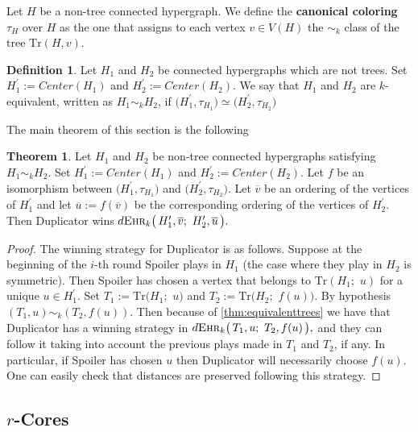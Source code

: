 \documentclass[12pt,notitlepage,a4paper]{article}
\theoremstyle{definition}
\newtheorem{theorem}{Theorem}[section]
\newtheorem{definition}{Definition}[section]
\newcommand{\ehr}{\textsc{Ehr}}
\newcommand{\Tr}{\mathrm{Tr}}
\begin{document}
Let $H$ be a non-tree connected hypergraph. We define
the \textbf{canonical coloring} $\tau_{H}$ over $H$
as the one that assigns to each vertex $v\in V(H)$ the $\sim_k$ class of the tree
$\Tr(H,v)$.\par

\begin{definition}
	Let $H_1$ and $H_2$ be connected hypergraphs which are not trees.
	Set $H^\prime_1:= Center(H_1)$ and $H^\prime_2:= Center(H_2)$.
	We say that $H_1$ and $H_2$ are $k$-equivalent,
	written as $H_1\sim_k H_2$, if
	$\big( H^\prime_1,\tau_{H_1}\big) \simeq 
	\big(H^\prime_2,\tau_{H_2}\big)$
\end{definition}

The main theorem of this section is the following
	
	\begin{theorem} \label{thm:strategyaux}
		Let $H_1$ and $H_2$ be non-tree 
		connected hypergraphs satisfying
		$H_1\sim_k H_2$. 
		Set $H^\prime_1:= Center(H_1)$ and 
		$H^\prime_2:= Center(H_2)$. Let $f$ be an isomorphism
		between $\big( H^\prime_1,\tau_{H_1}\big)$ and 
		$\big(H^\prime_2,\tau_{H_2}\big)$. Let $\overline{v}$ 
		be an ordering of the vertices of $H^\prime_1$ and let
		$\overline{u}:=f(\overline{v})$ be the corresponding
		ordering of the vertices of $H^\prime_2$. Then
		Duplicator wins 
		$	d\ehr_{k}\big(\,
		H^\prime_1,\overline{v};\,\,
		H^\prime_2,\overline{u}\,
		\big).
		$
	\end{theorem}
	\begin{proof}
		The winning strategy for Duplicator is as follows. 
		Suppose at the beginning of the $i$-th round
		Spoiler plays in $H_1$ (the case where they play in
		$H_2$ is symmetric). Then Spoiler has chosen a vertex 
		that belongs to $\mathrm{Tr}(H_1;\,\,u)$ for a unique
		$u\in H^\prime_1$. 
		Set $T_1:=\mathrm{Tr}\big(H_1;\,\,u\big)$ and
		$T_2:=\mathrm{Tr}\big(H_2;\,\,f(u)\big)$.
		By hypothesis
		$(T_1,u)\sim_k (T_2,f(u))$. 
		Then because of \cref{thm:equivalenttrees} we have that
		Duplicator has a winning strategy in
		$
		d\ehr_{k}\big(\,
		T_1,u; \, \, T_2, f(u)\,\big),
		$
		and they can follow it taking into account the previous
		plays made in $T_1$ and $T_2$, if any. In particular, 
		if Spoiler has chosen
		$u$ then Duplicator will necessarily choose $f(u)$.
		One can easily check that distances are preserved
		following this strategy. 
	\end{proof}
		
\subsection{$r$-Cores} \label{sec:Core}
\end{document}
